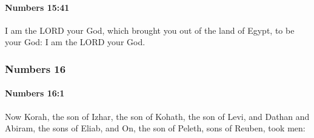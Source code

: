		\paragraph{Numbers 15:41} %
			\label{NUMBERS-15-41}

			I am the LORD your God, which brought you out of the land of Egypt, to be your God: I am the LORD your God.

	\subsubsection{Numbers 16} %
		\label{NUMBERS-16}

		\paragraph{Numbers 16:1} %
			\label{NUMBERS-16-1}

			Now Korah, the son of Izhar, the son of Kohath, the son of Levi, and Dathan and Abiram, the sons of Eliab, and On, the son of Peleth, sons of Reuben, took men:

